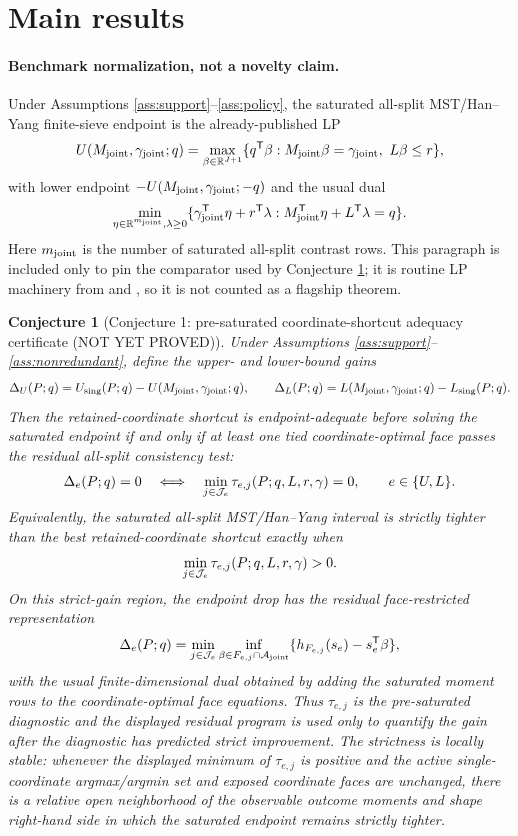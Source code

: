 \documentclass[11pt]{article}
\newcommand{\transpose}{\mathsf{T}}
\newcommand{\R}{\mathbb{R}}
\theoremstyle{definition}
\theoremstyle{plain}
\newtheorem{conjecture}{Conjecture}
\theoremstyle{remark}
\begin{document}
\section{Main results}
\paragraph{Benchmark normalization, not a novelty claim.}
Under Assumptions \ref{ass:support}--\ref{ass:policy}, the saturated
all-split MST/Han--Yang finite-sieve endpoint is the already-published LP
\[
U(M_{\rm joint},\gamma_{\rm joint};q)=
\max_{\beta\in\R^{J+1}}\{q^\transpose\beta:
M_{\rm joint}\beta=\gamma_{\rm joint},\ L\beta\le r\},
\]
with lower endpoint \(-U(M_{\rm joint},\gamma_{\rm joint};-q)\) and the usual
dual
\[
\min_{\eta\in\R^{m_{\rm joint}},\lambda\ge0}
\{\gamma_{\rm joint}^\transpose\eta+r^\transpose\lambda:
M_{\rm joint}^\transpose\eta+L^\transpose\lambda=q\}.
\]
Here \(m_{\rm joint}\) is the number of saturated all-split contrast rows.
This paragraph is included only to pin the comparator used by Conjecture
\ref{conj:width}; it is routine LP machinery from
\citet{MogstadSantosTorgovitsky2018} and \citet{HanYang2024}, so it is not
counted as a flagship theorem.

\begin{conjecture}[Conjecture 1: pre-saturated coordinate-shortcut adequacy certificate (NOT YET PROVED)]\label{conj:width}
Under Assumptions \ref{ass:support}--\ref{ass:nonredundant}, define the
upper- and lower-bound gains
\[
\Delta_U(P;q)=U_{\rm sing}(P;q)-U(M_{\rm joint},\gamma_{\rm joint};q),
\qquad
\Delta_L(P;q)=L(M_{\rm joint},\gamma_{\rm joint};q)-L_{\rm sing}(P;q).
\]
Then the retained-coordinate shortcut is endpoint-adequate before solving the
saturated endpoint if and only if at least one tied coordinate-optimal face
passes the residual all-split consistency test:
\[
\Delta_e(P;q)=0
\quad\Longleftrightarrow\quad
\min_{j\in{\cal J}_e}\tau_{e,j}(P;q,L,r,\gamma)=0,\qquad e\in\{U,L\}.
\]
Equivalently, the saturated all-split MST/Han--Yang interval is strictly
tighter than the best retained-coordinate shortcut exactly when
\[
\min_{j\in{\cal J}_e}\tau_{e,j}(P;q,L,r,\gamma)>0.
\]
On this strict-gain region, the endpoint drop has the residual
face-restricted representation
\[
\Delta_e(P;q)=
\min_{j\in{\cal J}_e}
\inf_{\beta\in F_{e,j}\cap{\cal A}_{\rm joint}}
\{h_{F_{e,j}}(s_e)-s_e^\transpose\beta\},
\]
with the usual finite-dimensional dual obtained by adding the saturated
moment rows to the coordinate-optimal face equations.  Thus \(\tau_{e,j}\) is
the pre-saturated diagnostic and the displayed residual program is used only
to quantify the gain after the diagnostic has predicted strict improvement.
The strictness is locally stable: whenever the displayed minimum of
\(\tau_{e,j}\) is positive and the active single-coordinate argmax/argmin set
and exposed coordinate faces are unchanged, there is a relative open
neighborhood of the observable outcome moments and shape right-hand side in
which the saturated endpoint remains strictly tighter.
\end{conjecture}
\end{document}
